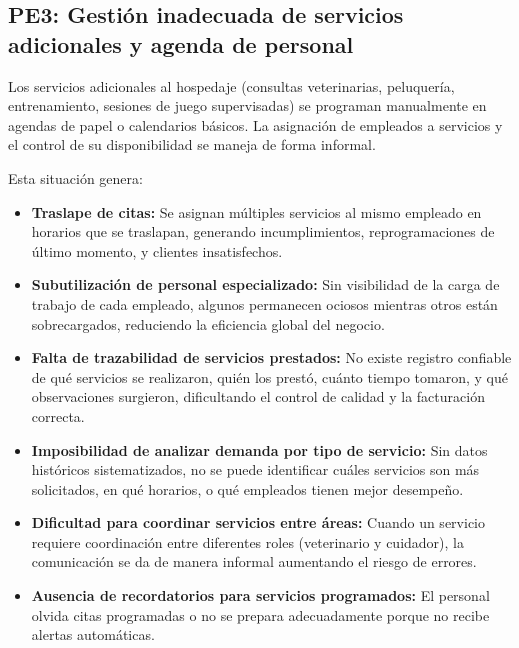 \subsection{PE3: Gestión inadecuada de servicios adicionales y agenda de personal}
\label{sec:pe3}

	Los servicios adicionales al hospedaje (consultas veterinarias, peluquería, entrenamiento, sesiones de juego supervisadas) se programan manualmente en agendas de papel o calendarios básicos. La asignación de empleados a servicios y el control de su disponibilidad se maneja de forma informal.
	
	Esta situación genera:
	
	\begin{itemize}
		\item \textbf{Traslape de citas:} Se asignan múltiples servicios al mismo empleado en horarios que se traslapan, generando incumplimientos, reprogramaciones de último momento, y clientes insatisfechos.
		
		\item \textbf{Subutilización de personal especializado:} Sin visibilidad de la carga de trabajo de cada empleado, algunos permanecen ociosos mientras otros están sobrecargados, reduciendo la eficiencia global del negocio.
		
		\item \textbf{Falta de trazabilidad de servicios prestados:} No existe registro confiable de qué servicios se realizaron, quién los prestó, cuánto tiempo tomaron, y qué observaciones surgieron, dificultando el control de calidad y la facturación correcta.
		
		\item \textbf{Imposibilidad de analizar demanda por tipo de servicio:} Sin datos históricos sistematizados, no se puede identificar cuáles servicios son más solicitados, en qué horarios, o qué empleados tienen mejor desempeño.
		
		\item \textbf{Dificultad para coordinar servicios entre áreas:} Cuando un servicio requiere coordinación entre diferentes roles (veterinario y cuidador), la comunicación se da de manera informal aumentando el riesgo de errores.
		
		\item \textbf{Ausencia de recordatorios para servicios programados:} El personal olvida citas programadas o no se prepara adecuadamente porque no recibe alertas automáticas.
	\end{itemize}


